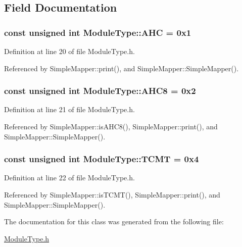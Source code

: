 \subsection{Field Documentation}
\hypertarget{class_module_type_aab41c936717bfb248a8bf1f38138db0b}{
\subsubsection[{A\-H\-C}]{\setlength{\rightskip}{0pt plus 5cm}const unsigned int Module\-Type\-::\-A\-H\-C = 0x1\hspace{0.3cm}{\ttfamily [static]}}}\label{class_module_type_aab41c936717bfb248a8bf1f38138db0b}


Definition at line 20 of file Module\-Type.\-h.



Referenced by Simple\-Mapper\-::print(), and Simple\-Mapper\-::\-Simple\-Mapper().

\hypertarget{class_module_type_a9cbd6a48fabe66ed9d47d23e53d8c9b9}{
\subsubsection[{A\-H\-C8}]{\setlength{\rightskip}{0pt plus 5cm}const unsigned int Module\-Type\-::\-A\-H\-C8 = 0x2\hspace{0.3cm}{\ttfamily [static]}}}\label{class_module_type_a9cbd6a48fabe66ed9d47d23e53d8c9b9}


Definition at line 21 of file Module\-Type.\-h.



Referenced by Simple\-Mapper\-::is\-A\-H\-C8(), Simple\-Mapper\-::print(), and Simple\-Mapper\-::\-Simple\-Mapper().

\hypertarget{class_module_type_a64c7a7092ce31ace2f6e1a44918cd7cc}{
\subsubsection[{T\-C\-M\-T}]{\setlength{\rightskip}{0pt plus 5cm}const unsigned int Module\-Type\-::\-T\-C\-M\-T = 0x4\hspace{0.3cm}{\ttfamily [static]}}}\label{class_module_type_a64c7a7092ce31ace2f6e1a44918cd7cc}


Definition at line 22 of file Module\-Type.\-h.



Referenced by Simple\-Mapper\-::is\-T\-C\-M\-T(), Simple\-Mapper\-::print(), and Simple\-Mapper\-::\-Simple\-Mapper().



The documentation for this class was generated from the following file\-:\begin{DoxyCompactItemize}
\item 
\hyperlink{_module_type_8h}{Module\-Type.\-h}\end{DoxyCompactItemize}
